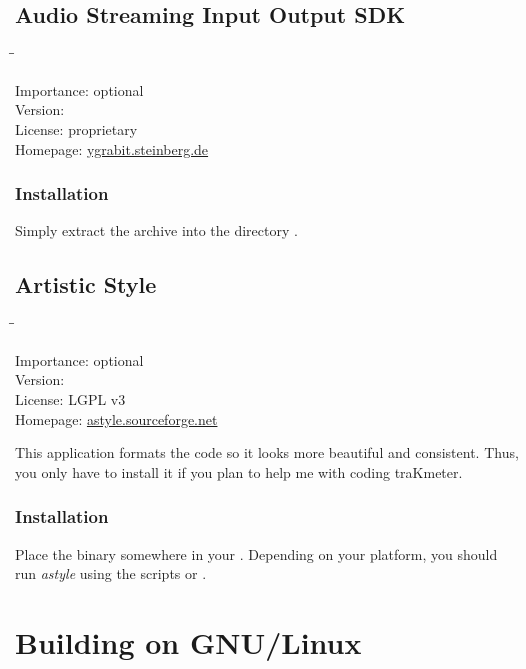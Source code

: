 \subsection{Audio Streaming Input Output SDK}

\begin{tabbing}
  \hspace*{6em}\=\=\kill

  Importance:  \> optional \\
  Version:      \\
  License:     \> proprietary \\
  Homepage:    \> \href{http://ygrabit.steinberg.de/}{ygrabit.steinberg.de}
\end{tabbing}

\subsubsection{Installation}

Simply extract the archive into the directory
.

\subsection{Artistic Style}

\begin{tabbing}
  \hspace*{6em}\=\=\kill

  Importance:  \> optional \\
  Version:      \\
  License:     \> LGPL v3 \\
  Homepage:    \> \href{http://astyle.sourceforge.net/}{astyle.sourceforge.net}
\end{tabbing}

This application formats the code so it looks more beautiful and
consistent.  Thus, you only have to install it if you plan to help me
with coding traKmeter.

\subsubsection{Installation}

Place the binary somewhere in your .  Depending on your
platform, you should run \emph{astyle} using the scripts
 or .

\section{Building on GNU/Linux}


